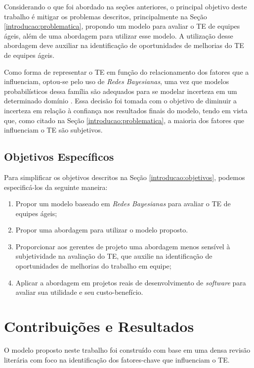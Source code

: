Considerando o que foi abordado na seções anteriores, o principal objetivo deste trabalho é mitigar os problemas descritos, principalmente na Seção \ref{introducao:problematica}, propondo um modelo para avaliar o TE de equipes ágeis, além de uma abordagem para utilizar esse modelo. A utilização desse abordagem deve auxiliar na identificação de oportunidades de melhorias do TE de equipes ágeis.

Como forma de representar o TE em função do relacionamento dos fatores que a influenciam, optou-se pelo uso de \textit{Redes Bayesianas}, uma vez que modelos probabilísticos dessa família são adequados para se modelar incerteza em um determinado domínio \cite{bengal}. Essa decisão foi tomada com o objetivo de diminuir a incerteza em relação à confiança nos resultados finais do modelo, tendo em vista que, como citado na Seção \ref{introducao:problematica}, a maioria dos fatores que influenciam o TE são subjetivos.

\subsection{Objetivos Específicos}
\label{introducao:objetivos:especificos}

Para simplificar os objetivos descritos na Seção \ref{introducao:objetivos}, podemos especificá-los da seguinte maneira:

\begin{enumerate}
  \item Propor um modelo baseado em \textit{Redes Bayesianas} para avaliar o TE de equipes ágeis;
  \item Propor uma abordagem para utilizar o modelo proposto.
  \item Proporcionar aos gerentes de projeto uma abordagem menos sensível à subjetividade na avaliação do TE, que auxilie na identificação de oportunidades de melhorias do trabalho em equipe;
  \item Aplicar a abordagem em projetos reais de desenvolvimento de \textit{software} para avaliar sua utilidade e seu custo-benefício.
\end{enumerate}

\section{Contribuições e Resultados}
\label{introducao:resultados}

O modelo proposto neste trabalho foi construído com base em uma densa revisão literária com foco na identificação dos fatores-chave que influenciam o TE.

